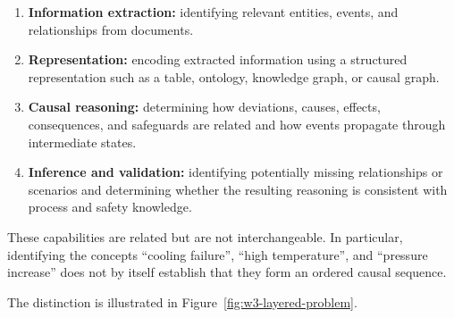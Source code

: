 \begin{enumerate}
    \item \textbf{Information extraction:} identifying relevant entities,
    events, and relationships from documents.

    \item \textbf{Representation:} encoding extracted information using a
    structured representation such as a table, ontology, knowledge graph, or
    causal graph.

    \item \textbf{Causal reasoning:} determining how deviations, causes,
    effects, consequences, and safeguards are related and how events
    propagate through intermediate states.

    \item \textbf{Inference and validation:} identifying potentially missing
    relationships or scenarios and determining whether the resulting
    reasoning is consistent with process and safety knowledge.
\end{enumerate}

These capabilities are related but are not interchangeable. In particular,
identifying the concepts ``cooling failure'', ``high temperature'', and
``pressure increase'' does not by itself establish that they form an ordered
causal sequence.

The distinction is illustrated in Figure~\ref{fig:w3-layered-problem}.

